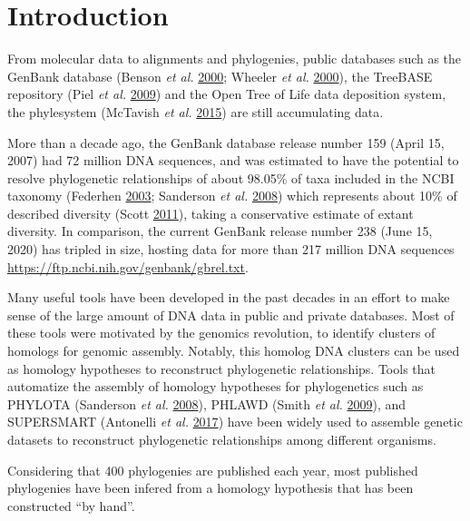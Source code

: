 \documentclass[]{article}
\begin{document}
\hypertarget{introduction}{%
\section{Introduction}\label{introduction}}

From molecular data to alignments and phylogenies, public databases such as the GenBank database (Benson \emph{et al.} \protect\hyperlink{ref-benson2000genbank}{2000}; Wheeler \emph{et al.} \protect\hyperlink{ref-wheeler2000database}{2000}), the TreeBASE repository (Piel \emph{et al.} \protect\hyperlink{ref-piel2009treebase}{2009}) and the Open Tree of Life data deposition system, the phylesystem (McTavish \emph{et al.} \protect\hyperlink{ref-mctavish2015phylesystem}{2015}) are still accumulating data.

More than a decade ago, the GenBank database release number 159 (April 15, 2007) had 72 million DNA sequences, and was estimated to have the potential to resolve phylogenetic relationships of about 98.05\% of taxa included in the NCBI taxonomy (Federhen \protect\hyperlink{ref-federhen2003taxonomy}{2003}; Sanderson \emph{et al.} \protect\hyperlink{ref-sanderson2008phylota}{2008}) which represents about 10\% of described diversity (Scott \protect\hyperlink{ref-scott2011ncbi}{2011}), taking a conservative estimate of extant diversity.
In comparison, the current GenBank release number 238 (June 15, 2020) has tripled in size, hosting data for more than 217 million DNA sequences \url{https://ftp.ncbi.nih.gov/genbank/gbrel.txt}.

Many useful tools have been developed in the past decades in an effort to make sense of the large amount of DNA data in public and private databases. Most of these tools were motivated by the genomics revolution, to identify clusters of homologs for genomic assembly. Notably, this homolog DNA clusters can be used as homology hypotheses to reconstruct phylogenetic relationships.
Tools that automatize the assembly of homology hypotheses for phylogenetics such as PHYLOTA (Sanderson \emph{et al.} \protect\hyperlink{ref-sanderson2008phylota}{2008}), PHLAWD (Smith \emph{et al.} \protect\hyperlink{ref-smith2009mega}{2009}), and SUPERSMART (Antonelli \emph{et al.} \protect\hyperlink{ref-antonelli2017toward}{2017}) have been widely used to assemble genetic datasets to reconstruct phylogenetic relationships among different organisms.

Considering that 400 phylogenies are published each year, most published phylogenies have been infered from a homology hypothesis that has been constructed ``by hand''.
\end{document}
